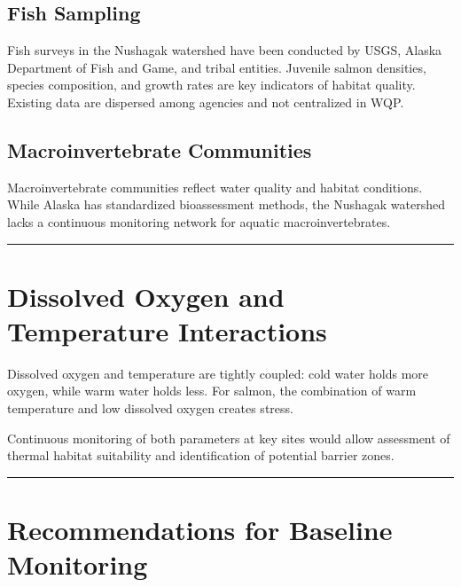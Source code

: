 \documentclass[
  letterpaper,
]{scrbook}
\begin{document}
\subsection{Fish Sampling}\label{fish-sampling}

Fish surveys in the Nushagak watershed have been conducted by USGS,
Alaska Department of Fish and Game, and tribal entities. Juvenile salmon
densities, species composition, and growth rates are key indicators of
habitat quality. Existing data are dispersed among agencies and not
centralized in WQP.

\subsection{Macroinvertebrate
Communities}\label{macroinvertebrate-communities}

Macroinvertebrate communities reflect water quality and habitat
conditions. While Alaska has standardized bioassessment methods, the
Nushagak watershed lacks a continuous monitoring network for aquatic
macroinvertebrates.

\begin{center}\rule{0.5\linewidth}{0.5pt}\end{center}

\section{Dissolved Oxygen and Temperature
Interactions}\label{dissolved-oxygen-and-temperature-interactions}

Dissolved oxygen and temperature are tightly coupled: cold water holds
more oxygen, while warm water holds less. For salmon, the combination of
warm temperature and low dissolved oxygen creates stress.

Continuous monitoring of both parameters at key sites would allow
assessment of thermal habitat suitability and identification of
potential barrier zones.

\begin{center}\rule{0.5\linewidth}{0.5pt}\end{center}

\section{Recommendations for Baseline
Monitoring}\label{recommendations-for-baseline-monitoring}
\end{document}
